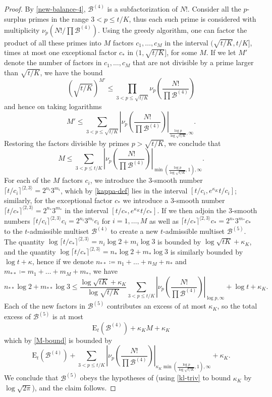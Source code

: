 \documentclass[12pt,a4paper,reqno]{amsart}
\numberwithin{equation}{section}
\theoremstyle{plain}
\theoremstyle{definition}
\newcommand\tuple{{\mathcal B}}
\newcommand\excess{{\mathrm{E}}}
\begin{document}
\begin{proof} By \eqref{new-balance-4}, $\tuple^{(4)}$ is a subfactorization of $N!$. Consider all the $p$-surplus primes in the range $3 < p \leq t/K$, thus each such prime is considered with multiplicity $\nu_p(N!/\prod \tuple^{(4)})$.  
Using the greedy algorithm, one can factor the product of all these primes into $M$ factors $c_1,\dots,c_M$ in the interval $(\sqrt{t/K}, t/K]$, times at most one exceptional factor $c_*$ in $(1,\sqrt{t/K}]$, for some $M$.  If we let $M'$ denote the number of factors in $c_1,\dots,c_M$ that are not divisible by a prime larger than $\sqrt{t/K}$, we have the bound
$$ \left(\sqrt{t/K}\right)^{M'} \leq
\prod_{3 < p \leq \sqrt{t/K}} \nu_p\left(\frac{N!}{\prod \tuple^{(4)}}\right)$$
and hence on taking logarithms
$$
M' \leq \sum_{3 < p \leq \sqrt{t/K}}
\left|\nu_p\left(\frac{N!}{\prod \tuple^{(4)}}\right)\right|_{\frac{\log p}{\log\sqrt{t/K}},\infty}. 
$$
Restoring the factors divisible by primes $p > \sqrt{t/K}$, we conclude that 
\begin{equation}\label{M-bound}  M \leq \sum_{3 < p \leq t/K}
\left|\nu_p\left(\frac{N!}{\prod \tuple^{(4)}}\right)\right|_{\min(\frac{\log p}{\log\sqrt{t/K}},1),\infty}. \end{equation}
For each of the $M$ factors $c_i$, we introduce the $3$-smooth number $\lceil t/c_i\rceil^{\langle 2,3\rangle} = 2^{n_i} 3^{m_i}$, which by \eqref{kappa-def} lies in the interval $[t/c_i,e^{\kappa_K} t/c_i]$; similarly, for the exceptional factor $c_*$ we introduce a $3$-smooth number $\lceil t/c_* \rceil^{\langle 2,3 \rangle} = 2^{n_*} 3^{m_*}$ in the interval $[t/c_*,e^{\kappa_K} t/c_*]$.  If we then adjoin the $3$-smooth numbers $\lceil t/c_i\rceil^{\langle 2,3\rangle} c_i = 2^{n_i} 3^{m_i} c_i$ for $i=1,\dots,M$ as well as $\lceil t/c_*\rceil^{\langle 2,3\rangle} c_* = 2^{n_*} 3^{m_*} c_*$ to the $t$-admissible multiset $\tuple^{(4)}$ to create a new $t$-admissible multiset $\tuple^{(5)}$.  The quantity $\log \lceil t/c_*\rceil^{\langle 2,3\rangle} = n_i \log 2 + m_i \log 3$ is bounded by $\log \sqrt{tK} + \kappa_K$, and the quantity $\log \lceil t/c_*\rceil^{\langle 2,3\rangle}  = n_* \log 2 + m_* \log 3$ is similarly bounded by $\log t + \kappa$, hence if we denote $n_{**} \coloneqq n_1 + \dots + n_M + n_*$ and $m_{**} \coloneqq m_1 + \dots + m_M + m_*$, we have
$$ n_{**} \log 2 + m_{**} \log 3 \leq 
\frac{\log \sqrt{tK} + \kappa_K}{\log\sqrt{t/K}}
\sum_{3 < p \leq t/K}
\left|\nu_p\left(\frac{N!}{\prod \tuple^{(4)}}\right)\right|_{\log p,\infty}
+ \log t + \kappa_K.$$
Each of the new factors in $\tuple^{(5)}$ contributes an excess of at most $\kappa_K$, so the total excess of $\tuple^{(5)}$ is at most
$$ \excess_t(\tuple^{(4)}) + \kappa_K M + \kappa_K$$
which by \eqref{M-bound} is bounded by
$$ \excess_t(\tuple^{(4)}) + \sum_{3 < p \leq t/K}
\left|\nu_p\left(\frac{N!}{\prod \tuple^{(4)}}\right)\right|_{\kappa_K \min(\frac{\log p}{\log\sqrt{t/K}},1),\infty} + \kappa_K.$$
We conclude that $\tuple^{(5)}$ obeys the hypotheses of  (using \eqref{kl-triv} to bound $\kappa_K$ by $\log \sqrt{2\pi}$), and the claim follows.
\end{proof}
\end{document}
